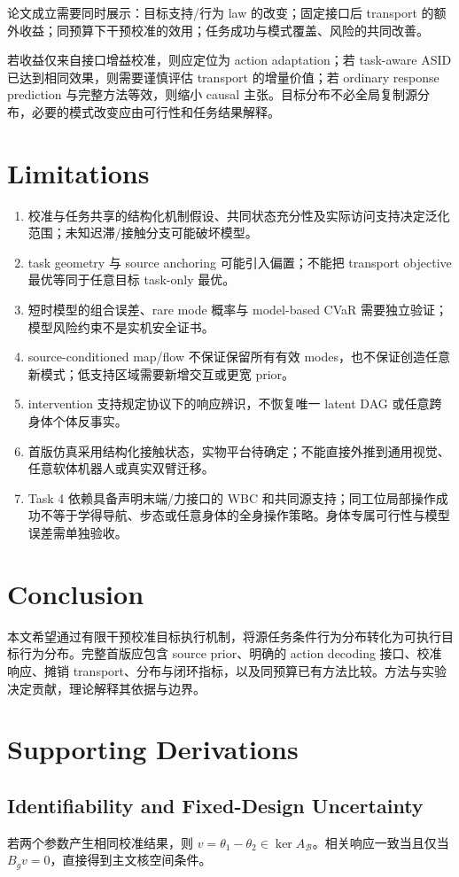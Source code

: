 \documentclass[11pt]{article}
\begin{document}
论文成立需要同时展示：目标支持/行为 law 的改变；固定接口后 transport 的额外收益；同预算下干预校准的效用；任务成功与模式覆盖、风险的共同改善。

若收益仅来自接口增益校准，则应定位为 action adaptation；若 task-aware ASID 已达到相同效果，则需要谨慎评估 transport 的增量价值；若 ordinary response prediction 与完整方法等效，则缩小 causal 主张。目标分布不必全局复制源分布，必要的模式改变应由可行性和任务结果解释。

\section{Limitations}
\begin{enumerate}
\item 校准与任务共享的结构化机制假设、共同状态充分性及实际访问支持决定泛化范围；未知迟滞/接触分支可能破坏模型。
\item task geometry 与 source anchoring 可能引入偏置；不能把 transport objective 最优等同于任意目标 task-only 最优。
\item 短时模型的组合误差、rare mode 概率与 model-based CVaR 需要独立验证；模型风险约束不是实机安全证书。
\item source-conditioned map/flow 不保证保留所有有效 modes，也不保证创造任意新模式；低支持区域需要新增交互或更宽 prior。
\item intervention 支持规定协议下的响应辨识，不恢复唯一 latent DAG 或任意跨身体个体反事实。
\item 首版仿真采用结构化接触状态，实物平台待确定；不能直接外推到通用视觉、任意软体机器人或真实双臂迁移。
\item Task 4 依赖具备声明末端/力接口的 WBC 和共同源支持；同工位局部操作成功不等于学得导航、步态或任意身体的全身操作策略。身体专属可行性与模型误差需单独验收。
\end{enumerate}

\section{Conclusion}
本文希望通过有限干预校准目标执行机制，将源任务条件行为分布转化为可执行目标行为分布。完整首版应包含 source prior、明确的 action decoding 接口、校准响应、摊销 transport、分布与闭环指标，以及同预算已有方法比较。方法与实验决定贡献，理论解释其依据与边界。

\appendix
\section{Supporting Derivations}
\subsection{Identifiability and Fixed-Design Uncertainty}
若两个参数产生相同校准结果，则 $v=\theta_1-\theta_2\in\ker A_{\mathcal B}$。相关响应一致当且仅当 $B_gv=0$，直接得到主文核空间条件。
\end{document}
